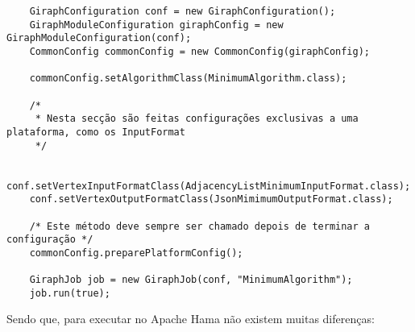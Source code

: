 	\begin{verbatim}
	GiraphConfiguration conf = new GiraphConfiguration();
	GiraphModuleConfiguration giraphConfig = new GiraphModuleConfiguration(conf);
	CommonConfig commonConfig = new CommonConfig(giraphConfig);
	
	commonConfig.setAlgorithmClass(MinimumAlgorithm.class);
	
	/* 
	 * Nesta secção são feitas configurações exclusivas a uma plataforma, como os InputFormat
	 */
	
	conf.setVertexInputFormatClass(AdjacencyListMinimumInputFormat.class);
	conf.setVertexOutputFormatClass(JsonMimimumOutputFormat.class);
	
	/* Este método deve sempre ser chamado depois de terminar a configuração */
	commonConfig.preparePlatformConfig();
	
	GiraphJob job = new GiraphJob(conf, "MinimumAlgorithm");
	job.run(true);

	\end{verbatim}
	
	Sendo que, para executar no Apache Hama não existem muitas diferenças:
	
